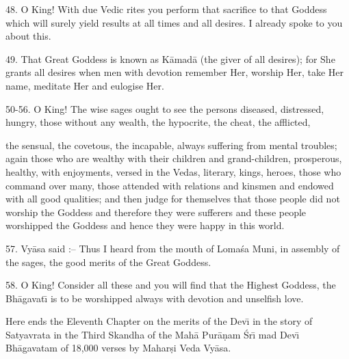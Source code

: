 48. O King! With due Vedic rites you perform that sacrifice to that Goddess which will surely yield results at all times and all desires. I already spoke to you about this.

49. That Great Goddess is known as K\=amad\=a (the giver of all desires); for She grants all desires when men with devotion remember Her, worship Her, take Her name, meditate Her and eulogise Her.

50-56. O King! The wise sages ought to see the persons diseased, distressed, hungry, those without any wealth, the hypocrite, the cheat, the afflicted,

the sensual, the covetous, the incapable, always suffering from mental troubles; again those who are wealthy with their children and grand-children, prosperous, healthy, with enjoyments, versed in the Vedas, literary, kings, heroes, those who command over many, those attended with relations and kinsmen and endowed with all good qualities; and then judge for themselves that those people did not worship the Goddess and therefore they were sufferers and these people worshipped the Goddess and hence they were happy in this world.

57. Vy\=asa said :-- Thus I heard from the mouth of Loma\'sa Muni, in assembly of the sages, the good merits of the Great Goddess.

58. O King! Consider all these and you will find that the Highest Goddess, the Bh\=agavat\={\i} is to be worshipped always with devotion and unselfish love.

Here ends the Eleventh Chapter on the merits of the Dev\={\i} in the story of Satyavrata in the Third Skandha of the Mah\=a Pur\=a\d{n}am \'Sr\={\i} mad Dev\={\i} Bh\=agavatam of 18,000 verses by Mahar\d{s}i Veda Vy\=asa.



